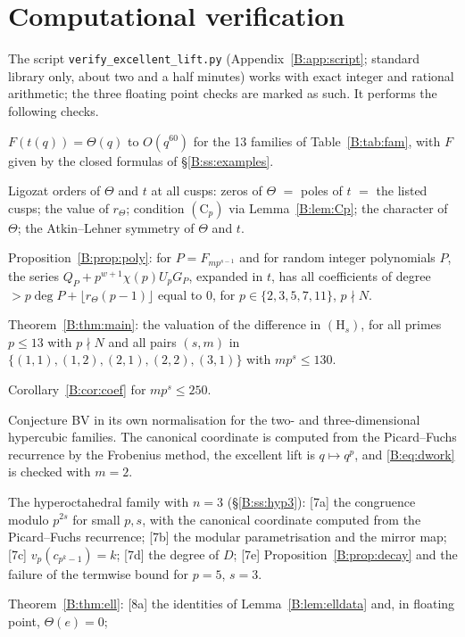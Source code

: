\documentclass[11pt,a4paper]{article}
\theoremstyle{definition}\newtheorem{definition}[theorem]{Definition}
\theoremstyle{remark}\newtheorem{remark}[theorem]{Remark}
\numberwithin{equation}{section}
\begin{document}
\section{Computational verification}\label{B:source-main-9}\label{B:sec:verif}
The script \texttt{verify\_excellent\_lift.py} (Appendix~\ref{B:app:script}; standard library only, about
two and a half minutes) works with exact integer and rational arithmetic; the three floating point checks are marked as
such. It performs the following checks.
\begin{enumerate}[label={[\arabic*]}]
\item $F(t(q))=\Theta(q)$ to $O(q^{60})$ for the 13 families of Table~\ref{B:tab:fam}, with $F$ given by
the closed formulas of \S\ref{B:ss:examples}.
\item Ligozat orders of $\Theta$ and $t$ at all cusps: zeros of $\Theta$ $=$ poles of $t$ $=$ the
listed cusps; the value of $r_\Theta$; condition $(\mathrm C_p)$ via Lemma~\ref{B:lem:Cp}; the character of $\Theta$; the
Atkin--Lehner symmetry of $\Theta$ and $t$.
\item Proposition~\ref{B:prop:poly}: for $P=F_{mp^{s-1}}$ and for random integer polynomials $P$, the
series $Q_P+p^{w+1}\chi(p)U_pG_P$, expanded in $t$, has all coefficients of degree
$>p\deg P+\lfloor r_\Theta(p-1)\rfloor$ equal to $0$, for $p\in\{2,3,5,7,11\}$, $p\nmid N$.
\item Theorem~\ref{B:thm:main}: the valuation of the difference in $(\mathrm H_s)$, for all primes
$p\le13$ with $p\nmid N$ and all pairs $(s,m)$ in $\{(1,1),(1,2),(2,1),(2,2),(3,1)\}$ with
$mp^s\le130$.
\item Corollary~\ref{B:cor:coef} for $mp^s\le250$.
\item Conjecture BV in its own normalisation for the two- and three-dimensional hypercubic
families. The canonical coordinate is computed from the Picard--Fuchs recurrence by the Frobenius
method, the excellent lift is $q\mapsto q^p$, and \eqref{B:eq:dwork} is checked with $m=2$.
\item The hyperoctahedral family with $n=3$ (\S\ref{B:ss:hyp3}): [7a] the congruence modulo $p^{2s}$ for small $p,s$, with
the canonical coordinate computed from the Picard--Fuchs recurrence; [7b] the modular parametrisation and the mirror map;
[7c] $v_p(c_{p^k-1})=k$; [7d] the degree of $D$; [7e] Proposition~\ref{B:prop:decay} and the failure of the termwise
bound for $p=5$, $s=3$.
\item Theorem~\ref{B:thm:ell}: [8a] the identities of Lemma~\ref{B:lem:elldata} and, in floating point, $\Theta(e)=0$;

\end{enumerate}
\end{document}
